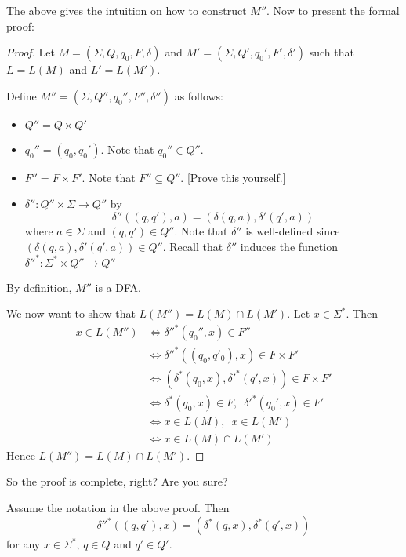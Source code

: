 The above gives the intuition on how to construct $M''$. Now to
present the formal proof:

\begin{proof}
Let $M = (\Sigma, Q, q_0, F, \delta)$ and $M' = (\Sigma,Q', q_0',
F', \delta')$ such that $L = L(M)$ and $L' = L(M')$.

Define $M'' = (\Sigma, Q'', q_0'', F'', \delta'')$ as follows:
 \begin{itemize}
 \item $Q'' = Q \times Q'$
 \item $q_0'' = (q_0,q_0')$. Note that $q_0'' \in Q''$.
 \item $F'' = F \times F'$. Note that $F'' \subseteq Q''$. [Prove
 this yourself.]
 \item $\delta'' : Q'' \times \Sigma \rightarrow Q''$ by
 \[
   \delta''((q,q'),a) = (\delta(q,a), \delta'(q',a))
 \]
 where $a \in \Sigma$ and $(q,q') \in Q''$.
 Note that $\delta''$ is well-defined since $(\delta(q,a),
 \delta'(q',a)) \in Q''$. Recall that $\delta''$ induces the function
 $\delta''^* : \Sigma^* \times Q'' \rightarrow Q''$
 \end{itemize}
By definition, $M''$ is a DFA.

We now want to show that $L(M'') = L(M) \cap L(M')$. Let $x \in
\Sigma^*$. Then
\begin{align*}
x \in L(M'')
&\iff \delta''^*(q_0'',x) \in F'' \\
&\iff \delta''^*((q_0,q'_0),x) \in F \times F' \\
&\iff (\delta^*(q_0,x), \delta'^*(q',x)) \in F \times F' \\
&\iff \delta^*(q_0,x) \in F, \,\,\, \delta'^*(q_0',x) \in F' \\
&\iff x \in L(M), \,\,\, x \in L(M') \\
&\iff x \in L(M) \cap L(M')
\end{align*}
Hence $L(M'') = L(M) \cap L(M')$.
\end{proof}

So the proof is complete, right? Are you sure?
\\

\begin{lem}
Assume the notation in the above proof. Then
\[
 \delta''^*((q,q'),x) = (\delta^*(q,x), \delta^*(q',x))
\]
for any $x \in \Sigma^*$, $q \in Q$ and $q' \in Q'$.
\end{lem}

